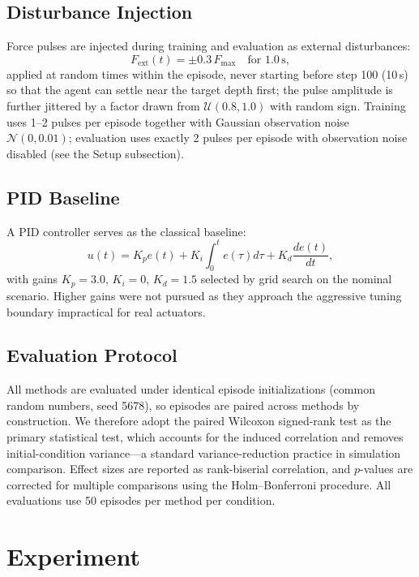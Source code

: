\documentclass[conference]{IEEEtran}
\begin{document}
\subsection{Disturbance Injection}
Force pulses are injected during training and evaluation as external disturbances:
\begin{equation}
F_{\text{ext}}(t) = \pm 0.3\,F_{\max} \quad \text{for } 1.0\,\text{s},
\end{equation}
applied at random times within the episode, never starting before step 100 (10\,s) so that the agent can settle near the target depth first; the pulse amplitude is further jittered by a factor drawn from $\mathcal{U}(0.8, 1.0)$ with random sign. Training uses 1--2 pulses per episode together with Gaussian observation noise $\mathcal{N}(0, 0.01)$; evaluation uses exactly 2 pulses per episode with observation noise disabled (see the Setup subsection).

\subsection{PID Baseline}
A PID controller serves as the classical baseline:
\begin{equation}
u(t) = K_p e(t) + K_i \int_0^t e(\tau) d\tau + K_d \frac{de(t)}{dt},
\end{equation}
with gains $K_p = 3.0$, $K_i = 0$, $K_d = 1.5$ selected by grid search on the nominal scenario. Higher gains were not pursued as they approach the aggressive tuning boundary impractical for real actuators.

\subsection{Evaluation Protocol}
All methods are evaluated under identical episode initializations (common random numbers, seed 5678), so episodes are paired across methods by construction. We therefore adopt the paired Wilcoxon signed-rank test as the primary statistical test, which accounts for the induced correlation and removes initial-condition variance---a standard variance-reduction practice in simulation comparison. Effect sizes are reported as rank-biserial correlation, and $p$-values are corrected for multiple comparisons using the Holm--Bonferroni procedure. All evaluations use 50 episodes per method per condition.

\section{Experiment}
\end{document}

